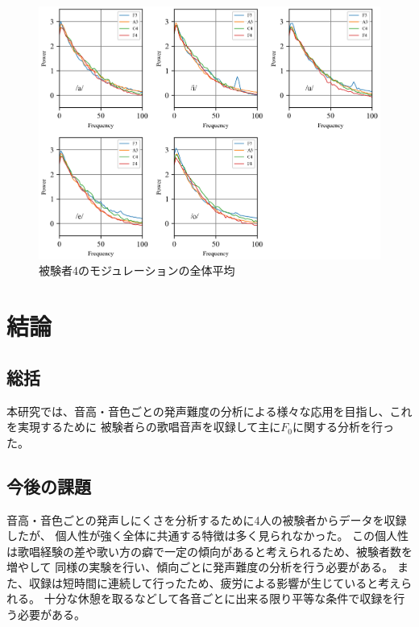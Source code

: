 \documentclass[10.5ptj,a4j,dvipdfmx,uplatex, oneside, openany, report]{jsbook}%
\begin{document}
\begin{figure}[htbp]
    \begin{center}
      \includegraphics[clip,width=12.0cm]{long_spectrogram_4.png}
      \caption{被験者4のモジュレーションの全体平均}
      \label{long_spectrogram_4}
    \end{center}
\end{figure}




\chapter{結論}
\section{総括}
本研究では、音高・音色ごとの発声難度の分析による様々な応用を目指し、これを実現するために
被験者らの歌唱音声を収録して主に$F_0$に関する分析を行った。

\section{今後の課題}

音高・音色ごとの発声しにくさを分析するために4人の被験者からデータを収録したが、
個人性が強く全体に共通する特徴は多く見られなかった。
この個人性は歌唱経験の差や歌い方の癖で一定の傾向があると考えられるため、被験者数を増やして
同様の実験を行い、傾向ごとに発声難度の分析を行う必要がある。
また、収録は短時間に連続して行ったため、疲労による影響が生じていると考えられる。
十分な休憩を取るなどして各音ごとに出来る限り平等な条件で収録を行う必要がある。
\end{document}
